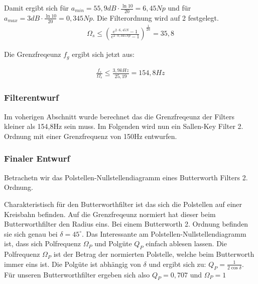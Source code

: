 \documentclass[11pt,twoside,a4paper,openright]{mpreport}
\begin{document}
Damit ergibt sich für $a_{min}=55,9 dB\cdot \frac{\ln{10}}{20}=6,45Np$ und für  $a_{max}=3 dB\cdot \frac{\ln{10}}{20}=0,345Np$. Die Filterordnung wird auf 2 festgelegt.
\begin{align}
\Omega_s \le  \left(\frac{e^{2\cdot6,45N }-1}{e^{2\cdot 0,345Np}-1}\right)^{\frac{1}{2n}}  = 35,8
\end{align}

Die Grenzfreqeunz $f_g$ ergibt sich jetzt aus:

\begin{align}
\frac{f_s}{\Omega_s} \le \frac{3,9kHz}{25,19} = 154,8Hz
\end{align}

\subsubsection{Filterentwurf}
Im voherigen Abschnitt wurde berechnet das die Grenzfreqeunz der Filters kleiner als 154,8Hz sein muss.
Im Folgenden wird nun ein Sallen-Key Filter 2. Ordnung mit einer Grenzfrequenz von 150Hz entwurfen.


\subsubsection{Finaler Entwurf}



Betrachetn wir das Polstellen-Nullstellendiagramm eines Butterworth Filters 2. Ordnung.


Charakteristisch für den Butterworthfilter ist das sich die Polstellen auf einer Kreisbahn befinden. Auf die Grenzfreqeunz normiert hat dieser beim Butterworthfilter den Radius
eins. Bei einem Butterworth 2. Ordnung befinden sie sich genau bei $\delta=45^\circ$. Das Interessante am Polstellen-Nullstellendiagramm ist, dass sich Polfrequenz $\Omega_P$ und 
Polgüte $Q_P$ einfach ablesen lassen. Die Polfrequenz $\Omega_P$ ist der Betrag der normierten Polstelle, welche beim Butterworth immer eins ist.
Die Polgüte ist abhängig von $\delta$ und ergibt sich zu: $Q_P=\frac{1}{2\cos{\delta}}$. Für unseren Butterworthfilter ergeben sich also $Q_P=0,707$ und $\Omega_P=1$
\end{document}
